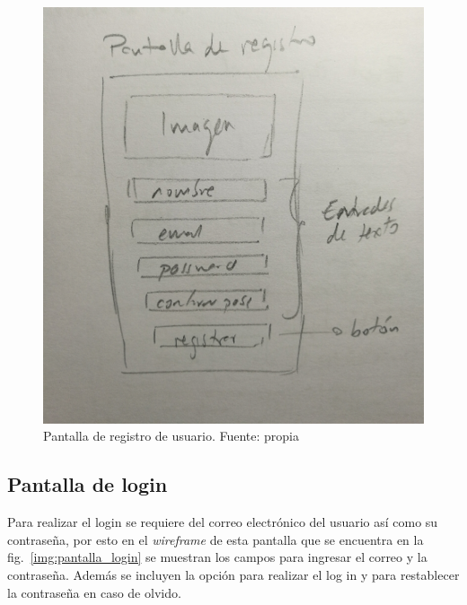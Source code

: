 \documentclass[12pt,letterpaper]{article}
\begin{document}
\begin{figure}[h!]
	\begin{center}
		\includegraphics[scale=0.07]{pantalla_registro.jpg}
		\caption{Pantalla de registro de usuario. Fuente: propia}
		\label{img:pantalla_registro}
	\end{center}
\end{figure}

\subsection{Pantalla de login}
Para realizar el login se requiere del correo electrónico del usuario así como su contraseña, por esto en el \textit{wireframe} de esta pantalla que se encuentra en la fig.~\ref{img:pantalla_login} se muestran los campos para ingresar el correo y la contraseña. Además se incluyen la opción para realizar el log in y para restablecer la contraseña en caso de olvido.
\end{document}
